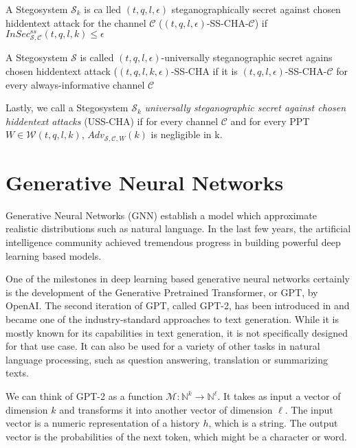 \begin{definition}
\label{def:sec-hopper}
A Stegosystem $\mathcal{S}_k$ is ca	lled $(t,q,l,\epsilon)$ steganographically secret against chosen hiddentext attack for the channel $\mathcal{C}$ ($(t,q,l,\epsilon)$-SS-CHA-$\mathcal{C}$) if $InSec_{\mathcal{S},\mathcal{C}}^{ss}(t,q,l,k) \leq \epsilon$
\end{definition}

\begin{definition}
A Stegosystem $\mathcal{S}$ is called $(t, q, l, \epsilon)$-universally steganographic secret agains chosen hiddentext attack ($(t,q,l,k,\epsilon)$-SS-CHA if it is $(t,q,l,\epsilon)$-SS-CHA-$\mathcal{C}$ for every always-informative channel $\mathcal{C}$
\end{definition}

Lastly, we call a Stegosystem $\mathcal{S}_k$ \emph{universally steganographic secret against chosen hiddentext attacks} (USS-CHA) if for every channel $\mathcal{C}$ and for every PPT $W \in \mathcal{W}(t,q,l,k)$, $Adv_{\mathcal{S},\mathcal{C},W}(k)$ is negligible in k.

\section{Generative Neural Networks}
\label{sec:generative-neural-networks}

Generative Neural Networks (GNN) establish a model which approximate realistic distributions such as natural language.
In the last few years, the artificial intelligence community achieved tremendous progress in building powerful deep learning based models.

One of the milestones in deep learning based generative neural networks certainly is the development of the Generative Pretrained Transformer, or GPT, by OpenAI.
The second iteration of GPT, called GPT-2, has been introduced in \cite{OpenAI2019} and became one of the industry-standard approaches to text generation.
While it is mostly known for its capabilities in text generation, it is not specifically designed for that use case.
It can also be used for a variety of other tasks in natural language processing, such as question answering, translation or summarizing texts.

We can think of GPT-2 as a function $\mathcal{M} \colon \mathbb{N}^k \rightarrow \mathbb{N}^\ell$. 
It takes as input a vector of dimension $k$ and transforms it into another vector of dimension $\ell$. 
The input vector is a numeric representation of a history $h$, which is a string.
The output vector is the probabilities of the next token, which might be a character or word.

